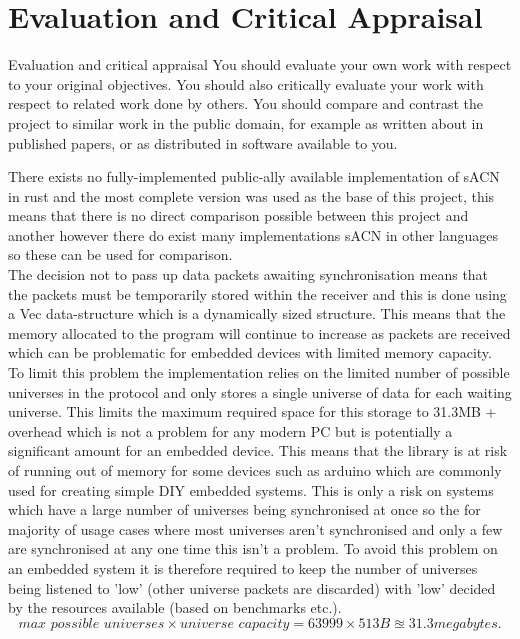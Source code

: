 \documentclass[11pt,a4paper]{article}
\begin{document}
\section{Evaluation and Critical Appraisal}
Evaluation and critical appraisal
You should evaluate your own work with respect to your original objectives. You should also critically evaluate your work with respect to related work done by others. You should compare and contrast the project to similar work in the public domain, for example as written about in published papers, or as distributed in software available to you.

There exists no fully-implemented public-ally available implementation of sACN in rust and the most complete version was used as the base of this project, this means that there is no direct comparison possible between this project and another however there do exist many implementations sACN in other languages so these can be used for comparison. \\


The decision not to pass up data packets awaiting synchronisation means that the packets must be temporarily stored within the receiver and this is done using a Vec data-structure which is a dynamically sized structure. This means that the memory allocated to the program will continue to increase as packets are received which can be problematic for embedded devices with limited memory capacity. To limit this problem the implementation relies on the limited number of possible universes in the protocol and only stores a single universe of data for each waiting universe. This limits the maximum required space for this storage to 31.3MB + overhead which is not a problem for any modern PC but is potentially a significant amount for an embedded device. This means that the library is at risk of running out of memory for some devices such as arduino \cite{ARDUINO} which are commonly used for creating simple DIY embedded systems. This is only a risk on systems which have a large number of universes being synchronised at once so the for majority of usage cases where most universes aren't synchronised and only a few are synchronised at any one time this isn't a problem. To avoid this problem on an embedded system it is therefore required to keep the number of universes being listened to 'low' (other universe packets are discarded) with 'low' decided by the resources available (based on benchmarks etc.).  
\[ 
\textit{max possible universes} \times \textit{universe capacity} = 63999 \times 513 B \approxeq 31.3 megabytes. 
\]
\end{document}
